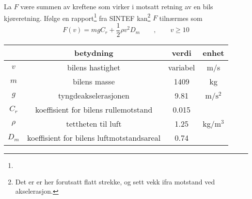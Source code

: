\newpage
{}

La $ F $ være summen av kreftene som virker i motsatt retning av en bils kjøreretning. Ifølge en rapport\footnote{} fra SINTEF kan\footnote{Det er er her forutsatt flatt strekke, og sett vekk ifra motstand ved akselerasjon.} $ F $ tilnærmes som
\[ F(v)= mgC_r+\frac{1}{2}\rho v^2 D_m\qquad,\qquad v\geq10\]
\begin{center}
	\begin{tabular}{c|c|c|c}
		& \textbf{betydning} & \textbf{verdi}&\textbf{enhet}  \\ \hline
		$ v $ & bilens hastighet & variabel& m/s \\
		$ m $& bilens masse\footnotemark & 1409 & kg\\
		$ g $& tyngdeakselerasjonen & 9.81 & m/$ \text{s}^2 $ \\
		$ C_r $ & koeffisient for bilens rullemotstand & 0.015\\
		$ \rho $ & tettheten til luft & 1.25 & kg/$ \text{m}^3 $ \\
		$ D_m $& koeffisient for bilens luftmotstandsareal\footnotemark &0.74
	\end{tabular}
\end{center}


